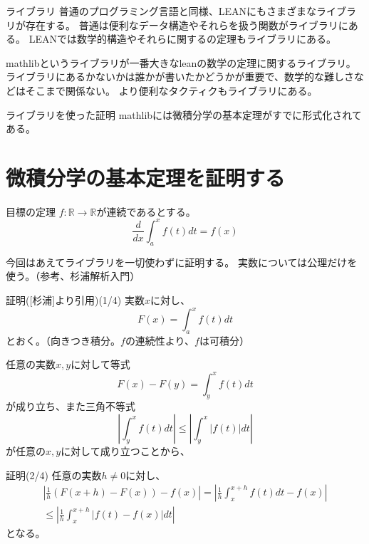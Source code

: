 \documentclass[unicode,12pt]{beamer}%
\begin{document}
\begin{frame}{ライブラリ}
  普通のプログラミング言語と同様、LEANにもさまざまなライブラリが存在する。
  普通は便利なデータ構造やそれらを扱う関数がライブラリにある。
  LEANでは数学的構造やそれらに関するの定理もライブラリにある。

  mathlibというライブラリが一番大きなleanの数学の定理に関するライブラリ。
  ライブラリにあるかないかは誰かが書いたかどうかが重要で、数学的な難しさなどはそこまで関係ない。
  より便利なタクティクもライブラリにある。
\end{frame}

\begin{frame}{ライブラリを使った証明}
  mathlibには微積分学の基本定理がすでに形式化されてある。
\end{frame}

\section{微積分学の基本定理を証明する}

\begin{frame}{目標の定理}
  $f:\mathbb{R}\to\mathbb{R}$が連続であるとする。
  $$
    \frac{d}{dx}\int^x_af(t)dt=f(x)
  $$

  今回はあえてライブラリを一切使わずに証明する。
  実数については公理だけを使う。（参考、杉浦解析入門）
\end{frame}

\begin{frame}{証明([杉浦]より引用)(1/4)}
  実数$x$に対し、
  $$
    F(x)=\int^x_af(t)dt
  $$
  とおく。（向きつき積分。$f$の連続性より、$f$は可積分）

  任意の実数$x, y$に対して等式
  $$
    F(x)-F(y)=\int^x_yf(t)dt
  $$
  が成り立ち、また三角不等式
  $$
    \left\lvert\int^x_yf(t)dt\right\rvert\leq\left\lvert\int^x_y\lvert f(t)\rvert dt\right\rvert
  $$
  が任意の$x, y$に対して成り立つことから、
\end{frame}

\begin{frame}{証明(2/4)}
  任意の実数$h\neq0$に対し、
  \begin{align*}
    \left\lvert\frac{1}{h}(F(x+h)-F(x))-f(x)\right\rvert
    =\left\lvert\frac{1}{h}\int^{x+h}_xf(t)dt-f(x)\right\rvert\\
    \leq\left\lvert\frac{1}{h}\int^{x+h}_x\lvert f(t)-f(x)\rvert dt\right\rvert 
  \end{align*}
  となる。
\end{frame}
\end{document}
